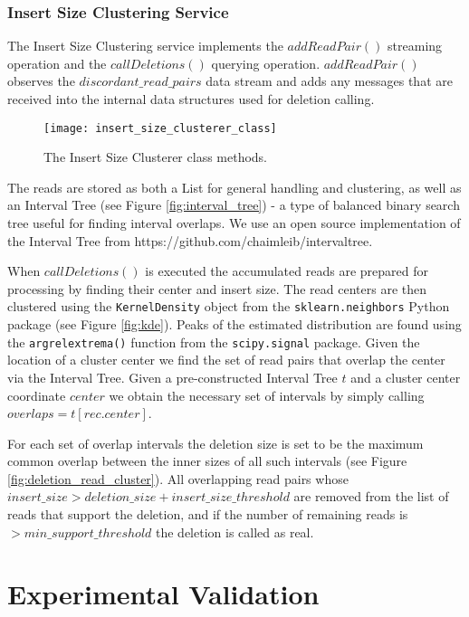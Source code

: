 \subsubsection{Insert Size Clustering Service}

The Insert Size Clustering service implements the $addReadPair()$ streaming operation and the $callDeletions()$ querying operation. $addReadPair()$ observes the $discordant\_read\_pairs$ data stream and adds any messages that are received into the internal data structures used for deletion calling. 

\begin{figure}[h!]
    \texttt{[image: insert\_size\_clusterer\_class]}
    \centering
    \caption {The Insert Size Clusterer class methods.}
    \label{fig:insert_size_clusterer_class}
\end{figure}

The reads are stored as both a List for general handling and clustering, as well as an Interval Tree (see Figure \ref{fig:interval_tree}) - a type of balanced binary search tree useful for finding interval overlaps. We use an open source implementation of the Interval Tree from https://github.com/chaimleib/intervaltree.

When $callDeletions()$ is executed the accumulated reads are prepared for processing by finding their center and insert size. The read centers are then clustered using the \texttt{KernelDensity} object from the \texttt{sklearn.neighbors} Python package (see Figure \ref{fig:kde}). Peaks of the estimated distribution are found using the \texttt{argrelextrema()} function from the \texttt{scipy.signal} package. Given the location of a cluster center we find the set of read pairs that overlap the center via the Interval Tree. Given a pre-constructed Interval Tree $t$ and a cluster center coordinate $center$ we obtain the necessary set of intervals by simply calling $overlaps = t[rec.center]$.

For each set of overlap intervals the deletion size is set to be the maximum common overlap between the inner sizes of all such intervals (see Figure \ref{fig:deletion_read_cluster}). All overlapping read pairs whose $insert\_size > deletion\_size + insert\_size\_threshold$ are removed from the list of reads that support the deletion, and if the number of remaining reads is $> min\_support\_threshold$ the deletion is called as real.

\section{Experimental Validation}\label{sec:rheos_validation}

